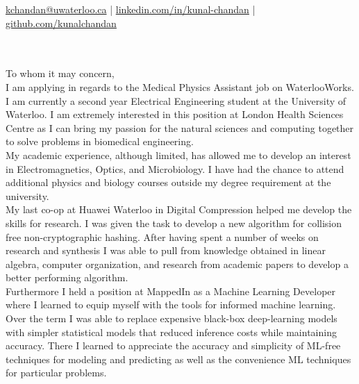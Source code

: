 \documentclass[]{chandan-cv}
\begin{document}
%
%

%
%
{
	\href{mailto:kchandan@uwaterloo.ca}{kchandan@uwaterloo.ca} \qquad
	| \qquad
	\href{https://www.linkedin.com/in/kunal-chandan/}{linkedin.com/in/kunal-chandan} \qquad
	| \qquad
	\href{http://github.com/kunalchandan}{github.com/kunalchandan}
}

\begin{minipage}[t]{0.2\textwidth}
\end{minipage}
\begin{minipage}[t]{0.8\textwidth}
\\
\vspace{10pt}
\large
\\
To whom it may concern,\\


\qquad I am applying in regards to the Medical Physics Assistant job on WaterlooWorks.
I am currently a second year Electrical Engineering student at the University of Waterloo. 
I am extremely interested in this position at London Health Sciences Centre as I can bring my passion for the natural sciences and computing together to solve problems in biomedical engineering.
\\


\qquad My academic experience, although limited, has allowed me to develop an interest in Electromagnetics, Optics, and Microbiology.
I have had the chance to attend additional physics and biology courses outside my degree requirement at the university. 
\\

\qquad My last co-op at Huawei Waterloo in Digital Compression helped me develop the skills for research. 
I was given the task to develop a new algorithm for collision free non-cryptographic hashing. 
After having spent a number of weeks on research and synthesis I was able to pull from knowledge obtained in linear algebra, computer organization, and research from academic papers to develop a better performing algorithm.
\\

\qquad Furthermore I held a position at MappedIn as a Machine Learning Developer where I learned to equip myself with the tools for informed machine learning. 
Over the term I was able to replace expensive black-box deep-learning models with simpler statistical models that reduced inference costs while maintaining accuracy. 
There I learned to appreciate the accuracy and simplicity of ML-free techniques for modeling and predicting as well as the convenience ML techniques for particular problems. 
\\



\end{minipage}
\end{document}

